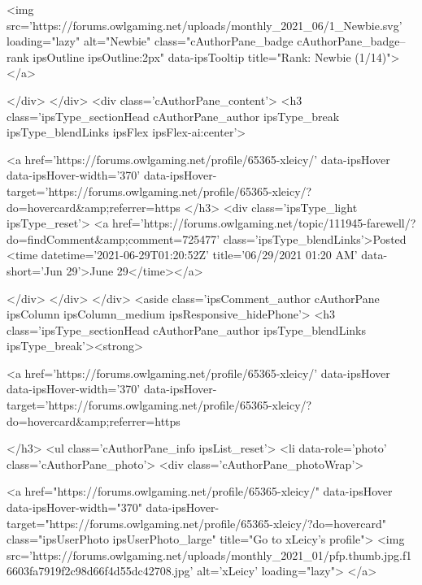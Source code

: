 <img src='https://forums.owlgaming.net/uploads/monthly_2021_06/1_Newbie.svg' loading="lazy" alt="Newbie" class="cAuthorPane_badge cAuthorPane_badge--rank ipsOutline ipsOutline:2px" data-ipsTooltip title="Rank: Newbie (1/14)">
					</a>
				
			</div>
		</div>
		<div class='cAuthorPane_content'>
			<h3 class='ipsType_sectionHead cAuthorPane_author ipsType_break ipsType_blendLinks ipsFlex ipsFlex-ai:center'>
				


<a href='https://forums.owlgaming.net/profile/65365-xleicy/' data-ipsHover data-ipsHover-width='370' data-ipsHover-target='https://forums.owlgaming.net/profile/65365-xleicy/?do=hovercard&amp;referrer=https%
			</h3>
			<div class='ipsType_light ipsType_reset'>
				<a href='https://forums.owlgaming.net/topic/111945-farewell/?do=findComment&amp;comment=725477' class='ipsType_blendLinks'>Posted <time datetime='2021-06-29T01:20:52Z' title='06/29/2021 01:20  AM' data-short='Jun 29'>June 29</time></a>
				
			</div>
		</div>
	</div>
	<aside class='ipsComment_author cAuthorPane ipsColumn ipsColumn_medium ipsResponsive_hidePhone'>
		<h3 class='ipsType_sectionHead cAuthorPane_author ipsType_blendLinks ipsType_break'><strong>


<a href='https://forums.owlgaming.net/profile/65365-xleicy/' data-ipsHover data-ipsHover-width='370' data-ipsHover-target='https://forums.owlgaming.net/profile/65365-xleicy/?do=hovercard&amp;referrer=https%
			
		</h3>
		<ul class='cAuthorPane_info ipsList_reset'>
			<li data-role='photo' class='cAuthorPane_photo'>
				<div class='cAuthorPane_photoWrap'>
					


	<a href="https://forums.owlgaming.net/profile/65365-xleicy/" data-ipsHover data-ipsHover-width="370" data-ipsHover-target="https://forums.owlgaming.net/profile/65365-xleicy/?do=hovercard" class="ipsUserPhoto ipsUserPhoto_large" title="Go to xLeicy's profile">
		<img src='https://forums.owlgaming.net/uploads/monthly_2021_01/pfp.thumb.jpg.f16603fa7919f2c98d66f4d55dc42708.jpg' alt='xLeicy' loading="lazy">
	</a>

					
					
